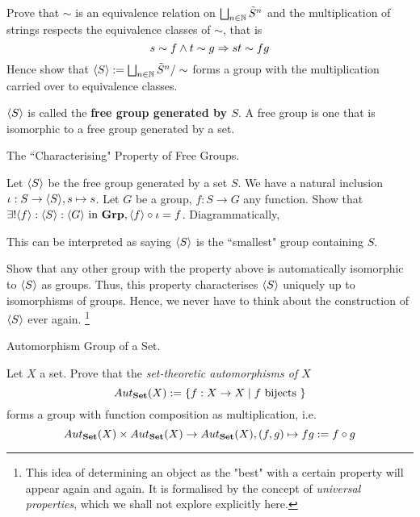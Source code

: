 \documentclass[../book.tex]{subfiles}
\begin{document}
\begin{ex} [Skippable]
    Prove that $\sim$ is an equivalence relation on 
    $\bigsqcup_{n \in \mathbb{N}} \tilde{S}^n$
    and the multiplication of strings respects the equivalence classes of $\sim$,
    that is
    \[
        s \sim f \land t \sim g \Rightarrow st \sim fg
    \]
    Hence show that $\langle S \rangle := 
    \bigsqcup_{n \in \mathbb{N}} \tilde{S}^n / \sim$
    forms a group with the multiplication carried over to equivalence classes. 
    
    $\langle S \rangle$ is called the \textbf{free group generated by $S$}. 
    A free group is one that is isomorphic to a free group generated by a set. 
\end{ex}

\begin{ex} [Skippable] The ``Characterising" Property of Free Groups. 

    Let $\langle S \rangle$ be the free group generated by a set $S$. 
    We have a natural inclusion $\iota : S \to \langle S \rangle, s \mapsto s$.
    Let $G$ be a group, $f : S \to G$ any function. 
    Show that 
    $\exists ! \langle f \rangle : \langle S \rangle : \langle G\rangle \text{ in } \mathbf{Grp}, 
    \langle f \rangle \circ \iota = f$. 
    Diagrammatically, 
    \begin{figure} [ht]
        \centering
    \end{figure}
    
    This can be interpreted as saying $\langle S \rangle$ is the 
    ``smallest" group containing $S$. 
    
    Show that any other group with the property above is automatically
    isomorphic to $\langle S \rangle$ as groups. 
    Thus, this property characterises $\langle S \rangle$ uniquely
    up to isomorphisms of groups. 
    Hence, we never have to think about 
    the construction of $\langle S \rangle$ ever again.
    \footnote{
        This idea of determining an object
        as the "best" with a certain property will appear again and again. 
        It is formalised by the concept of \emph{universal properties},
        which we shall not explore explicitly here. 
    }
\end{ex}

\begin{ex} Automorphism Group of a Set. 

    Let $X$ a set. Prove that the \emph{set-theoretic automorphisms of $X$}
    \[Aut_{\mathbf{Set}}(X) := \{f : X \to X \mid f \text{ bijects }\}\] forms a group
    with function composition as multiplication, i.e.
    \[
        Aut_{\mathbf{Set}}(X) \times Aut_{\mathbf{Set}}(X) \to Aut_{\mathbf{Set}}(X), 
        (f, g) \mapsto fg := f \circ g
    \]
\end{ex}
\end{document}
